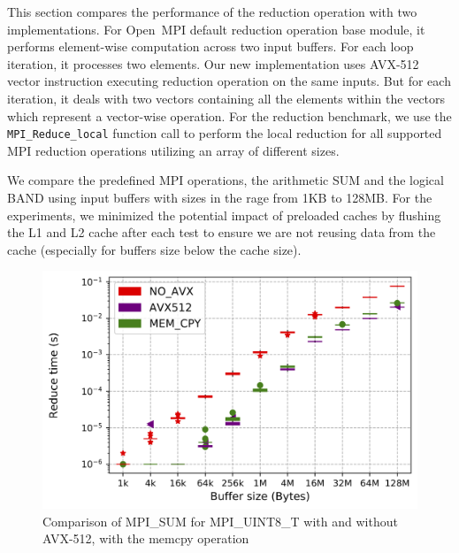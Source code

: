 \documentclass[5p,times,twocolumn]{elsarticle}
\newcommand{\mpifunc}[1]{\lstinline"MPI_#1"\xspace}
\newcommand{\ompi}[0]{Open~MPI\xspace}
\begin{document}
This section compares the performance of the reduction operation with two
implementations.
For \ompi default reduction operation base module, it
performs element-wise computation across two input buffers. For each loop iteration,
it processes two elements. Our new implementation uses AVX-512 vector instruction
executing reduction operation on the same inputs. But for each iteration, it
deals with two vectors containing all the elements within the vectors which represent
a vector-wise operation.
For the reduction benchmark, we use the \mpifunc{Reduce_local} function call to
perform the local reduction for all supported MPI reduction operations utilizing an array of different sizes.

We compare the predefined MPI operations, the arithmetic SUM and the logical BAND using input buffers with sizes in the rage from 1KB to 128MB. 
For the experiments, we minimized the potential impact of preloaded caches by flushing the L1 and L2 cache after each test to ensure we are not reusing data from the cache (especially for buffers size below the cache size).

\begin{figure}[h]
    \centering
    \includegraphics[width=\linewidth]{avx_extend_more_sum_u8_1k-128M.png}
    \caption{Comparison of MPI\_SUM for MPI\_UINT8\_T with and without AVX-512, with the memcpy operation}
    \label{fig:avxsum}
\end{figure}
\end{document}
